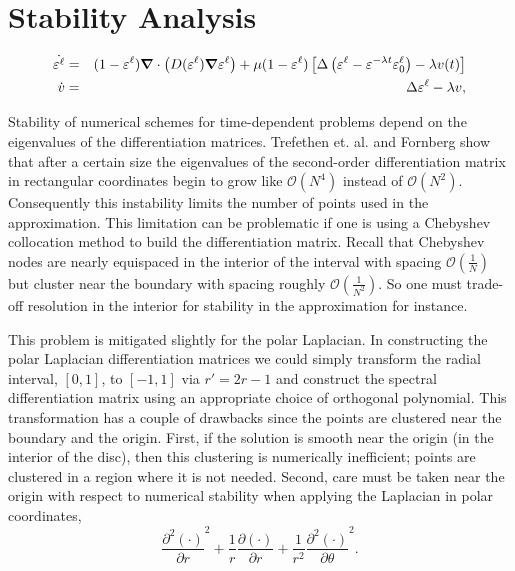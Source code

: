 \documentclass[12pt]{article}
\newcommand{\pdiff}[2]{\frac{\partial #1}{\partial #2}}
\newcommand{\pdiffsec}[2]{\frac{\partial^2 #1}{\partial #2}^2}
\def\bnab{\mbox{\boldmath$\nabla$}}
\def\e{\varepsilon}
\renewcommand\l{\ell}
\begin{document}
\section{Stability Analysis}

\begin{eqnarray}\label{eq:VPIDE_System}
\nonumber
  \dot{\e^\l} &=& (1-\e^\l)\bnab\cdot\left(D(\e^\l)\bnab\e^\l\right) + \mu(1-\e^\l)\left[\Delta\left(\e^\l - \e^{-\lambda t}\e^\l_0\right) - \lambda v(t)\right] \\
  \dot{v} &=& \Delta \e^\l-\lambda v,
\end{eqnarray}

Stability of numerical schemes for time-dependent problems depend on the eigenvalues of the differentiation matrices. Trefethen et. al. and Fornberg \cite{InstSpecMeth,FornbergText} show that after a certain size the eigenvalues of the second-order differentiation matrix in rectangular coordinates begin to grow like $\mathcal{O}(N^4)$ instead of $\mathcal{O}(N^2)$. Consequently this instability limits the number of points used in the approximation. This limitation can be problematic if one is using a Chebyshev collocation method to build the differentiation matrix. Recall that Chebyshev nodes are nearly equispaced in the interior of the interval with spacing $\mathcal{O}(\frac{1}{N})$ but cluster near the boundary with spacing roughly $\mathcal{O}(\frac{1}{N^2})$. So one must trade-off resolution in the interior for stability in the approximation for instance.

This problem is mitigated slightly for the polar Laplacian. In constructing the polar Laplacian differentiation matrices we could simply transform the radial interval, $[0,1]$, to $[-1,1]$ via $r' = 2r-1$ and construct the spectral differentiation matrix using an appropriate choice of orthogonal polynomial. This transformation has a couple of drawbacks since the points are clustered near the boundary and the origin. First, if the solution is smooth near the origin (in the interior of the disc), then this clustering is numerically inefficient; points are clustered in a region where it is not needed. Second, care must be taken near the origin with respect to numerical stability when applying the Laplacian in polar coordinates,
\begin{equation}\label{eq:polar_Laplacian}
\pdiffsec{(\cdot)}{r} +\frac{1}{r}\pdiff{(\cdot)}{r}+\frac{1}{r^2}\pdiffsec{(\cdot)}{\theta}.
\end{equation}
\end{document}
